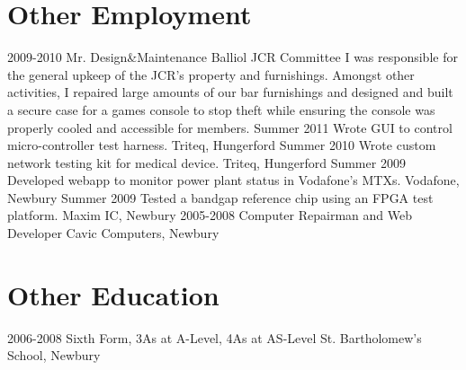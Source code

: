 \documentclass[4pt, print]{friggeri-cv}
\begin{document}
\section{Other Employment}
\begin{entrylist}
  \entry
    {2009-2010}
    { Mr. Design\&Maintenance}
    {Balliol JCR Committee}
    {I was responsible for the general upkeep of the JCR's property and furnishings. Amongst other activities, I repaired large amounts of our bar furnishings and designed and built a secure case for a games console to stop theft while ensuring the console was properly cooled and accessible for members.}
  \threeentry
    {Summer 2011}
    { Wrote GUI to control micro-controller test harness.}
    {Triteq, Hungerford}
  \threeentry
    {Summer 2010}
    { Wrote custom network testing kit for medical device.}
    {Triteq, Hungerford}
  \threeentry
    {Summer 2009}
    { Developed webapp to monitor power plant status in Vodafone's MTXs.}
    {Vodafone, Newbury}
  \threeentry
    {Summer 2009}
    { Tested a bandgap reference chip using an FPGA test platform.}
    {Maxim IC, Newbury}
  \threeentry
    {2005-2008}
    { Computer Repairman and Web Developer}
    {Cavic Computers,  Newbury}
 \end{entrylist}
 
 \section{Other Education}
\begin{entrylist}
 \threeentry
    {2006-2008}
    {Sixth Form, 3As at A-Level, 4As at AS-Level}
    {St. Bartholomew's School, Newbury}
 \end{entrylist}
\end{document}
